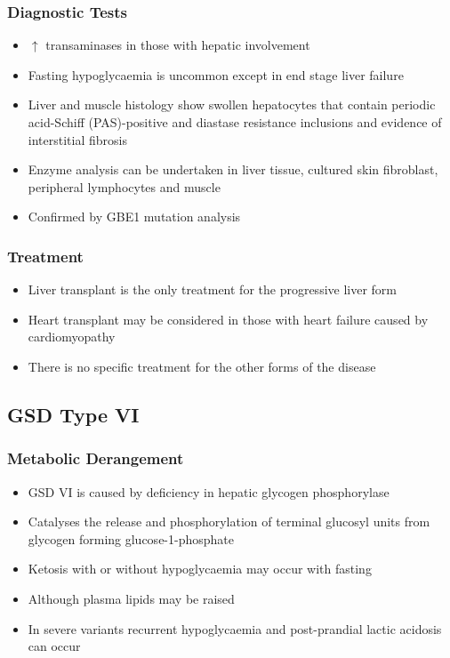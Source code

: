 \documentclass{scrartcl}
\begin{document}
\subsubsection{Diagnostic Tests}
\label{sec:orgc160545}

\begin{itemize}
\item \(\uparrow\) transaminases in those with hepatic involvement
\item Fasting hypoglycaemia is uncommon except in end stage liver failure
\item Liver and muscle histology show swollen hepatocytes that contain
periodic acid-Schiff (PAS)-positive and diastase resistance
inclusions and evidence of interstitial fibrosis
\item Enzyme analysis can be undertaken in liver tissue, cultured skin
fibroblast, peripheral lymphocytes and muscle
\item Confirmed by GBE1 mutation analysis
\end{itemize}

\subsubsection{Treatment}
\label{sec:orga8f46d9}
\begin{itemize}
\item Liver transplant is the only treatment for the progressive liver form
\item Heart transplant may be considered in those with heart failure caused by cardiomyopathy
\item There is no specific treatment for the other forms of the disease
\end{itemize}
\subsection{GSD Type VI}
\label{sec:org637a3f4}
\subsubsection{Metabolic Derangement}
\label{sec:org4dbfe03}
\begin{itemize}
\item GSD VI is caused by deficiency in hepatic glycogen phosphorylase
\item Catalyses the release and phosphorylation of terminal glucosyl units
from glycogen forming glucose-1-phosphate
\item Ketosis with or without hypoglycaemia may occur with fasting
\item Although plasma lipids may be raised
\item In severe variants recurrent hypoglycaemia and post-prandial lactic
acidosis can occur
\end{itemize}
\end{document}
